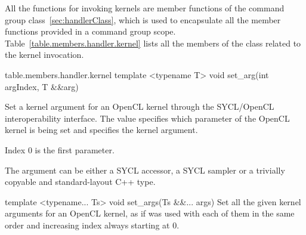 All the functions for invoking kernels are member functions of the command group
 class~\ref{sec:handlerClass}, which 
is used to encapsulate all the member functions provided in a command group scope.
Table~\ref{table.members.handler.kernel} lists all the members of the 
 class related to the kernel invocation.

{table.members.handler.kernel}
  \addRowTwoL
    {template <typename T>}
    {void set_arg(int argIndex, T \&\&arg)}
    {
      Set a kernel argument for an OpenCL kernel through the
      SYCL/OpenCL interoperability interface. The 
      value specifies which parameter of the OpenCL kernel is being
      set and  specifies the kernel argument.

      Index 0 is the first parameter.

      The argument can be either a SYCL accessor, a SYCL sampler or a
      trivially copyable and standard-layout C++ type.
     }

  \addRowTwoL
    {template <typename... Ts>}
    {void set_args(Ts \&\&... args)}
    {
      Set all the given kernel  arguments for an
      OpenCL kernel, as if  was used with each
      of them in the same order and increasing index always starting
      at 0.
    }

